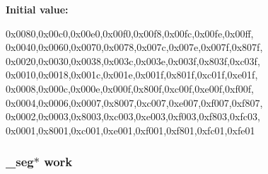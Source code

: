 \label{WL__SCALE_8C_a1c8053b1c5185cc1701015d26ca61eb0}
{\bfseries Initial value:}
\begin{DoxyCode}
 {
{0x0080,0x00c0,0x00e0,0x00f0,0x00f8,0x00fc,0x00fe,0x00ff},
{0x0040,0x0060,0x0070,0x0078,0x007c,0x007e,0x007f,0x807f},
{0x0020,0x0030,0x0038,0x003c,0x003e,0x003f,0x803f,0xc03f},
{0x0010,0x0018,0x001c,0x001e,0x001f,0x801f,0xc01f,0xe01f},
{0x0008,0x000c,0x000e,0x000f,0x800f,0xc00f,0xe00f,0xf00f},
{0x0004,0x0006,0x0007,0x8007,0xc007,0xe007,0xf007,0xf807},
{0x0002,0x0003,0x8003,0xc003,0xe003,0xf003,0xf803,0xfc03},
{0x0001,0x8001,0xc001,0xe001,0xf001,0xf801,0xfc01,0xfe01} }
\end{DoxyCode}
\hypertarget{WL__SCALE_8C_a163511d4eb7f7ce00c635dc774a864c6}{
\subsubsection[{work}]{ \_\-seg$\ast$ {\bf work}}}
\label{WL__SCALE_8C_a163511d4eb7f7ce00c635dc774a864c6}
